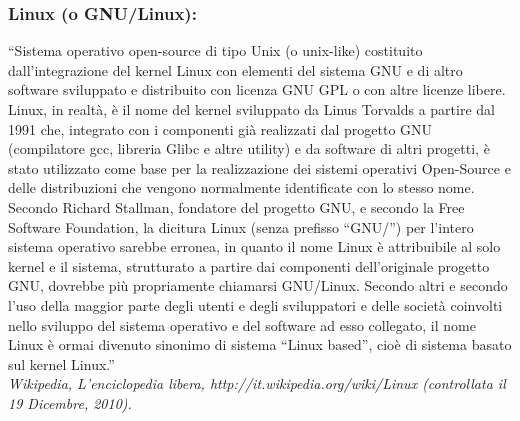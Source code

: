\subsubsection{Linux (o GNU/Linux):} ``Sistema operativo open-source di
tipo Unix (o unix-like) costituito dall'integrazione del kernel Linux con
elementi del sistema GNU e di altro software sviluppato e distribuito con
licenza GNU GPL o con altre licenze libere. Linux, in realt\`a, \`e il nome del
kernel sviluppato da Linus Torvalds a partire dal 1991 che, integrato con i
componenti gi\`a realizzati dal progetto GNU (compilatore gcc, libreria Glibc e
altre utility) e da software di altri progetti, \`e stato utilizzato come base per
la realizzazione dei sistemi operativi Open-Source e delle distribuzioni che
vengono normalmente identificate con lo stesso nome. Secondo Richard Stallman,
fondatore del progetto GNU, e secondo la Free Software Foundation, la dicitura
Linux (senza prefisso ``GNU/'') per l'intero sistema operativo sarebbe erronea, in
quanto il nome Linux \`e attribuibile al solo kernel e il sistema, strutturato a
partire dai componenti dell'originale progetto GNU, dovrebbe pi\`u propriamente
chiamarsi GNU/Linux. Secondo altri e secondo l'uso della maggior parte degli
utenti e degli sviluppatori e delle societ\`a coinvolti nello sviluppo del sistema
operativo e del software ad esso collegato, il nome Linux \`e ormai divenuto
sinonimo di sistema ``Linux based'', cio\`e di sistema basato sul kernel
Linux.''\\ \emph{Wikipedia, L'enciclopedia libera,
http://it.wikipedia.org/wiki/Linux (controllata il 19 Dicembre, 2010).}


